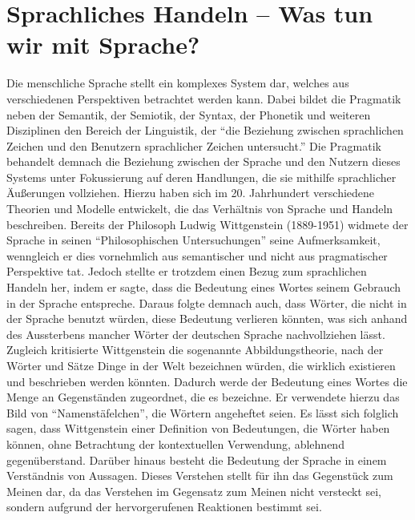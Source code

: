 \section{Sprachliches Handeln – Was tun wir mit Sprache?}
Die menschliche Sprache stellt ein komplexes System dar, welches aus verschiedenen Perspektiven betrachtet werden kann.
Dabei bildet die Pragmatik neben der Semantik, der Semiotik, der Syntax, der Phonetik und weiteren Disziplinen den Bereich der Linguistik, der "`die Beziehung zwischen sprachlichen Zeichen und den Benutzern sprachlicher Zeichen untersucht."'\cite{Dud14b}
Die Pragmatik behandelt demnach die Beziehung zwischen der Sprache und den Nutzern dieses Systems unter Fokussierung auf deren Handlungen, die sie mithilfe sprachlicher Äußerungen vollziehen.
Hierzu haben sich im 20. Jahrhundert verschiedene Theorien und Modelle entwickelt, die das Verhältnis von Sprache und Handeln beschreiben.
Bereits der Philosoph Ludwig Wittgenstein (1889-1951) widmete der Sprache in seinen "`Philosophischen Untersuchungen"' seine Aufmerksamkeit, wenngleich er dies vornehmlich aus semantischer und nicht aus pragmatischer Perspektive tat\cite[S. 63]{PA99}.
Jedoch stellte er trotzdem einen Bezug zum sprachlichen Handeln her, indem er sagte, dass die Bedeutung eines Wortes seinem Gebrauch in der Sprache entspreche.
Daraus folgte demnach auch, dass Wörter, die nicht in der Sprache benutzt würden, diese Bedeutung verlieren könnten, was sich anhand des Aussterbens mancher Wörter der deutschen Sprache nachvollziehen lässt.
Zugleich kritisierte Wittgenstein die sogenannte Abbildungstheorie, nach der Wörter und Sätze Dinge in der Welt bezeichnen würden, die wirklich existieren und beschrieben werden könnten.
Dadurch werde der Bedeutung eines Wortes die Menge an Gegenständen zugeordnet, die es bezeichne.
Er verwendete hierzu das Bild von "`Namenstäfelchen"'\cite[S. 64]{PA99}, die Wörtern angeheftet seien.
Es lässt sich folglich sagen, dass Wittgenstein einer Definition von Bedeutungen, die Wörter haben können, ohne Betrachtung der kontextuellen Verwendung, ablehnend gegenüberstand.
Darüber hinaus besteht die Bedeutung der Sprache in einem Verständnis von Aussagen.
Dieses Verstehen stellt für ihn das Gegenstück zum Meinen dar, da das Verstehen im Gegensatz zum Meinen nicht versteckt sei, sondern aufgrund der hervorgerufenen Reaktionen bestimmt sei\cite[S. 68]{PA99}.

